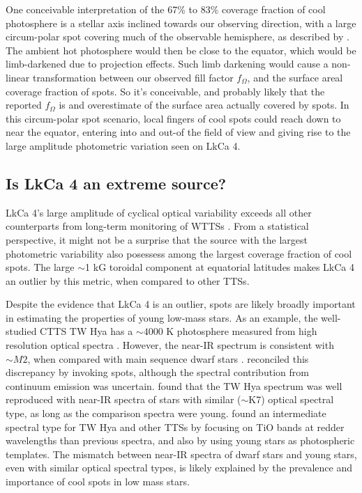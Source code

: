 \documentclass[12pt]{report}
\newcommand{\name}{LkCa 4 }
\begin{document}
One conceivable interpretation of the 67\% to 83\% coverage fraction of cool photosphere is a stellar axis inclined towards our observing direction, with a large circum-polar spot covering much of the observable hemisphere, as described by \citet{donati14}.  The ambient hot photosphere would then be close to the equator, which would be limb-darkened due to projection effects.  Such limb darkening would cause a non-linear transformation between our observed fill factor $f_{\Omega}$, and the surface areal coverage fraction of spots.  So it's conceivable, and probably likely that the reported $f_{\Omega}$ is and overestimate of the surface area actually covered by spots.  In this circum-polar spot scenario, local fingers of cool spots could reach down to near the equator, entering into and out-of the field of view and giving rise to the large amplitude photometric variation seen on LkCa 4.

\subsection{Is \name an extreme source?}
LkCa 4's large amplitude of cyclical optical variability exceeds all other counterparts from long-term monitoring of WTTSs \citep{grankin08}.  From a statistical perspective, it might not be a surprise that the source with the largest photometric variability also posessess among the largest coverage fraction of cool spots.  The large $\sim$1 kG toroidal component at equatorial latitudes makes LkCa 4 an outlier by this metric, when compared to other TTSs.

Despite the evidence that LkCa 4 is an outlier, spots are likely broadly important in estimating the properties of young low-mass stars. As an example, the well-studied CTTS TW Hya has a $\sim 4000$ K photosphere measured from high resolution optical spectra \citep[e.g.][]{yang05}.  However, the near-IR spectrum is consistent with $\sim M2$, when compared with main sequence dwarf stars \citep{vacca11}.  \citet{debes13} reconciled this discrepancy by invoking spots, although the spectral contribution from continuum emission was uncertain.  \citet{mcclure13} found that the TW Hya spectrum was well reproduced with near-IR spectra of stars with similar ($\sim$K7) optical spectral type, as long as the comparison spectra were young.   \citet{herczeg14} found an intermediate spectral type for TW Hya and other TTSs by focusing on TiO bands at redder wavelengths than previous spectra, and also by using young stars as photospheric templates.  The mismatch between near-IR spectra of dwarf stars and young stars, even with similar optical spectral types, is likely explained by the prevalence and importance of cool spots in low mass stars.
\end{document}
